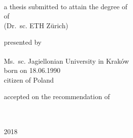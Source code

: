 
\begin{titlepage}

\begin{addmargin}[-1cm]{-3cm}
\begin{center}
\large

\hfill
\vfill


\vfill

\begingroup
\color{Maroon}
\\
\medskip
\\
\medskip
{} \\
\bigskip %
\endgroup

\vfill

a thesis submitted to attain the degree of \\
\bigskip
{} of  \\
\smallskip
{\small (Dr.\ sc. ETH Zürich)}

\vfill

presented by \\
\bigskip
\spacedallcaps{\myName} \\
\bigskip
{\small Ms.\ sc. Jagiellonian University in Kraków \\
\smallskip
born on 18.06.1990 \\
\smallskip
citizen of Poland}

\vfill

accepted on the recommendation of \\
\bigskip
{} \\
\smallskip
{} \\
\smallskip
{}

\vfill

2018

\vfill

\end{center}
\end{addmargin}

\end{titlepage}
